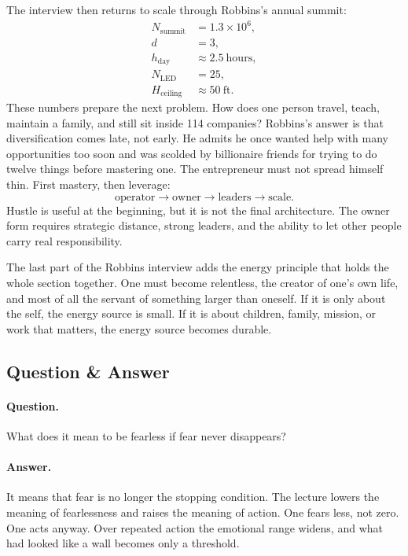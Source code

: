 The interview then returns to scale through Robbins's annual summit:
\begin{align}
N_{\text{summit}} &= 1.3\times 10^{6},\\
d &= 3,\\
h_{\text{day}} &\approx 2.5\ \text{hours},\\
N_{\text{LED}} &= 25,\\
H_{\text{ceiling}} &\approx 50\ \text{ft}.
\end{align}
These numbers prepare the next problem. How does one person travel, teach, maintain a family, and still sit inside 114 companies? Robbins's answer is that diversification comes late, not early. He admits he once wanted help with many opportunities too soon and was scolded by billionaire friends for trying to do twelve things before mastering one. The entrepreneur must not spread himself thin. First mastery, then leverage:
\begin{equation}
\text{operator} \to \text{owner} \to \text{leaders} \to \text{scale}.
\end{equation}
Hustle is useful at the beginning, but it is not the final architecture. The owner form requires strategic distance, strong leaders, and the ability to let other people carry real responsibility.

The last part of the Robbins interview adds the energy principle that holds the whole section together. One must become relentless, the creator of one's own life, and most of all the servant of something larger than oneself. If it is only about the self, the energy source is small. If it is about children, family, mission, or work that matters, the energy source becomes durable.

\subsection{Question \& Answer}

\paragraph{Question.} What does it mean to be fearless if fear never disappears?

\paragraph{Answer.} It means that fear is no longer the stopping condition. The lecture lowers the meaning of fearlessness and raises the meaning of action. One fears less, not zero. One acts anyway. Over repeated action the emotional range widens, and what had looked like a wall becomes only a threshold.

